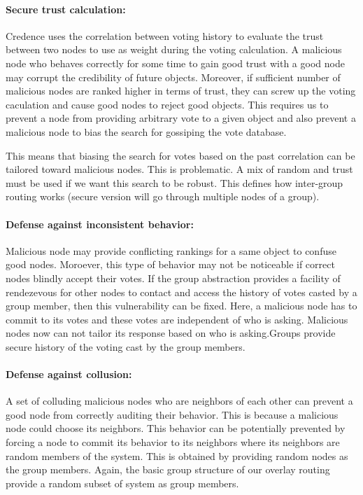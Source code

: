 \paragraph{Secure trust calculation:} Credence uses the correlation between voting history to evaluate the trust between two nodes to use as weight during the voting calculation. A malicious node who behaves correctly for some time to gain good trust with a good node may corrupt the credibility of future objects. Moreover, if sufficient number of malicious nodes are ranked higher in terms of trust, they can screw up the voting caculation and cause good nodes to reject good objects. This requires us to prevent a node from providing arbitrary vote to a given object and also prevent a malicious node to bias the search for gossiping the vote database. 

This means that biasing the search for votes based on the past correlation can be tailored toward malicious nodes. This is problematic. A mix of random and trust must be used if we want this search to be robust. This defines how inter-group routing works (secure version will go through multiple nodes of a group).

\paragraph{Defense against inconsistent behavior:} Malicious node may provide conflicting rankings for a same object to confuse good nodes. Moroever, this type of behavior may not be noticeable if correct nodes blindly accept their votes. If the group abstraction provides a facility of rendezevous for other nodes to contact and access the history of votes casted by a group member, then this vulnerability can be fixed. Here, a malicious node has to commit to its votes and these votes are independent of who is asking. Malicious nodes now can not tailor its response based on who is asking.Groups provide secure history of the voting cast by the group members.

\paragraph{Defense against collusion:} A set of colluding malicious nodes who are neighbors of each other can prevent a good node from correctly auditing their behavior. This is because a malicious node could choose its neighbors. This behavior can be potentially prevented by forcing a node to commit its behavior to its neighbors where its neighbors are random members of the system. This is obtained by providing random nodes as the group members. Again, the basic group structure of our overlay routing provide a random subset of system as group members.

